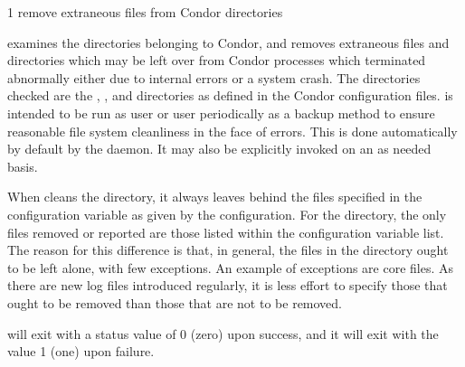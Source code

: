 \begin{ManPage}{\label{man-condor-preen}}{1}
{remove extraneous files from Condor directories}
\Synopsis {}


\Description 

 examines the directories belonging to Condor, 
and removes extraneous files and directories which may be left over from
Condor processes which terminated abnormally either due to internal errors or
a system crash. The directories checked are 
the , , and 
directories as defined in the Condor configuration files.  is
intended to be run as user  or user 
periodically as a backup
method to ensure reasonable file system cleanliness in the face of
errors. This is done automatically by default by the  daemon. 
It may also be explicitly invoked on an as needed basis.

When  cleans the  directory, it always leaves
behind the files specified in the configuration variable
 as given by the configuration.
For the  directory, the only files removed or reported are those
listed within the configuration variable  list.
The reason for this difference is that, in general,
the files in the  directory ought to be left alone,
with few exceptions.
An example of exceptions are core files.
As there are new log files introduced regularly,
it is less effort to specify those that ought to be removed
than those that are not to be removed.

\begin{Options}




\end{Options}

\ExitStatus

 will exit with a status value of 0 (zero) upon success,
and it will exit with the value 1 (one) upon failure.

\end{ManPage}
